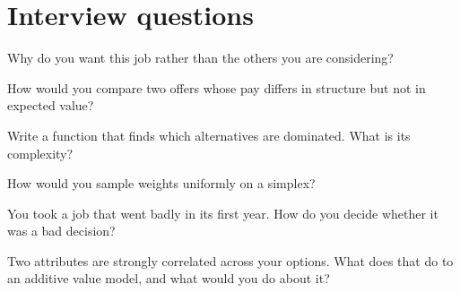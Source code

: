 \section{Interview questions}

\begin{interviewq}\label{iq:in:choosing:1}
Why do you want this job rather than the others you are considering?
\end{interviewq}

\begin{interviewq}\label{iq:in:choosing:2}
How would you compare two offers whose pay differs in structure but not in expected value?
\end{interviewq}

\begin{interviewq}\label{iq:in:choosing:3}
Write a function that finds which alternatives are dominated. What is its complexity?
\end{interviewq}

\begin{interviewq}\label{iq:in:choosing:4}
How would you sample weights uniformly on a simplex?
\end{interviewq}

\begin{interviewq}\label{iq:in:choosing:5}
You took a job that went badly in its first year. How do you decide whether it was a bad decision?
\end{interviewq}

\begin{interviewq}\label{iq:in:choosing:6}
Two attributes are strongly correlated across your options. What does that do to an additive value model, and what would
you do about it?
\end{interviewq}
